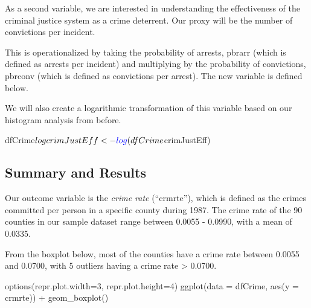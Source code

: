 \documentclass[]{article}
\newenvironment{Shaded}{}{}
\newcommand{\DataTypeTok}[1]{#1}
\newcommand{\DecValTok}[1]{#1}
\newcommand{\KeywordTok}[1]{\textcolor[rgb]{0.00,0.00,1.00}{#1}}
\newcommand{\NormalTok}[1]{#1}
\newcommand{\OperatorTok}[1]{#1}
\newcommand{\StringTok}[1]{\textcolor[rgb]{0.00,0.50,0.50}{#1}}
\begin{document}
As a second variable, we are interested in understanding the
effectiveness of the criminal justice system as a crime deterrent. Our
proxy will be the number of convictions per incident.

This is operationalized by taking the probability of arrests, pbrarr
(which is defined as arrests per incident) and multiplying by the
probability of convictions, pbrconv (which is defined as convictions per
arrest). The new variable is defined below.

\begin{Shaded}
\end{Shaded}

We will also create a logarithmic transformation of this variable based
on our histogram analysis from before.

\begin{Shaded}
\begin{Highlighting}[]
\NormalTok{dfCrime}\OperatorTok{$}\NormalTok{logcrimJustEff<-}\KeywordTok{log}\NormalTok{(dfCrime}\OperatorTok{$}\NormalTok{crimJustEff)}
\end{Highlighting}
\end{Shaded}

\hypertarget{summary-and-results}{%
\subsection{Summary and Results}\label{summary-and-results}}

Our outcome variable is the \emph{crime rate} (``crmrte''), which is
defined as the crimes committed per person in a specific county during
1987. The crime rate of the 90 counties in our sample dataset range
between 0.0055 - 0.0990, with a mean of 0.0335.

From the boxplot below, most of the counties have a crime rate between
0.0055 and 0.0700, with 5 outliers having a crime rate \textgreater{}
0.0700.

\begin{Shaded}
\begin{Highlighting}[]
\KeywordTok{options}\NormalTok{(}\DataTypeTok{repr.plot.width=}\DecValTok{3}\NormalTok{, }\DataTypeTok{repr.plot.height=}\DecValTok{4}\NormalTok{)}
\KeywordTok{ggplot}\NormalTok{(}\DataTypeTok{data =}\NormalTok{ dfCrime, }\KeywordTok{aes}\NormalTok{(}\DataTypeTok{y =}\NormalTok{ crmrte)) }\OperatorTok{+}\StringTok{ }
\StringTok{      }\KeywordTok{geom_boxplot}\NormalTok{()}
\end{Highlighting}
\end{Shaded}
\end{document}
